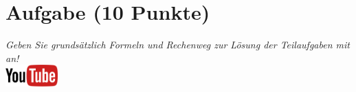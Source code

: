 \documentclass[a4paper, 10pt]{scrartcl}\usepackage[]{graphicx}\usepackage[]{xcolor}
\begin{document}
\clearpage\null
\clearpage\null 
\clearpage

\section{Aufgabe \hfill (10 Punkte)}

\textit{Geben Sie grunds{\"a}tzlich Formeln und Rechenweg zur L{\"o}sung der
  Teilaufgaben mit an!} \\[1Ex]

\hfill\href{https://youtu.be/paXxVmyfDPs}{\includegraphics[width =
  2cm]{img/youtube}} %
\hspace{2Ex}

\vspace{1Ex}
\end{document}
